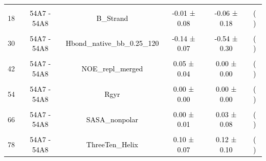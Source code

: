 \documentclass{article}\usepackage[table]{xcolor}
\renewcommand{\$}{$} %
\begin{document}
\begin{center}
\begin{longtable}[t]{lccccc}
\cellcolor{gray!6}{12} & \cellcolor{gray!6}{\textcolor{black}{54A7 - 54A8}} & \cellcolor{gray!6}{\textcolor{black}{B\_Bridge}} & \cellcolor{gray!6}{\textcolor{black}{0.02 ± 0.05}} & \cellcolor{gray!6}{\textcolor{black}{0.02 ± 0.08}} & \cellcolor{gray!6}{\textcolor{black}{( )}}\\
18 & \textcolor{black}{54A7 - 54A8} & \textcolor{black}{B\_Strand} & \textcolor{black}{-0.01 ± 0.08} & \textcolor{black}{-0.06 ± 0.18} & \textcolor{black}{( )}\\
\cellcolor{gray!6}{24} & \cellcolor{gray!6}{\textcolor{black}{54A7 - 54A8}} & \cellcolor{gray!6}{\textcolor{black}{Hbond\_bb\_0.25\_120}} & \cellcolor{gray!6}{\textcolor{black}{-0.07 ± 0.05}} & \cellcolor{gray!6}{\textcolor{black}{-0.29 ± 0.26}} & \cellcolor{gray!6}{\textcolor{black}{( )}}\\
30 & \textcolor{black}{54A7 - 54A8} & \textcolor{black}{Hbond\_native\_bb\_0.25\_120} & \textcolor{black}{-0.14 ± 0.07} & \textcolor{black}{-0.54 ± 0.30} & \textcolor{black}{( )}\\
\cellcolor{gray!6}{36} & \cellcolor{gray!6}{\textcolor{black}{54A7 - 54A8}} & \cellcolor{gray!6}{\textcolor{black}{Jvalue}} & \cellcolor{gray!6}{\textcolor{black}{0.02 ± 0.09}} & \cellcolor{gray!6}{\textcolor{black}{0.03 ± 0.07}} & \cellcolor{gray!6}{\textcolor{black}{( )}}\\
42 & \textcolor{black}{54A7 - 54A8} & \textcolor{black}{NOE\_repl\_merged} & \textcolor{black}{0.05 ± 0.04} & \textcolor{black}{0.00 ± 0.00} & \textcolor{black}{( )}\\
\cellcolor{gray!6}{48} & \cellcolor{gray!6}{\textcolor{black}{54A7 - 54A8}} & \cellcolor{gray!6}{\textcolor{black}{Pi\_Helix}} & \cellcolor{gray!6}{\textcolor{black}{0.04 ± 0.10}} & \cellcolor{gray!6}{\textcolor{black}{0.08 ± 0.11}} & \cellcolor{gray!6}{\textcolor{black}{( )}}\\
54 & \textcolor{black}{54A7 - 54A8} & \textcolor{black}{Rgyr} & \textcolor{black}{0.00 ± 0.00} & \textcolor{black}{0.00 ± 0.00} & \textcolor{black}{( )}\\
\cellcolor{gray!6}{60} & \cellcolor{gray!6}{\textcolor{black}{54A7 - 54A8}} & \cellcolor{gray!6}{\textcolor{black}{RMSD.ADJ}} & \cellcolor{gray!6}{\textcolor{black}{0.13 ± 0.07}} & \cellcolor{gray!6}{\textcolor{black}{0.01 ± 0.01}} & \cellcolor{gray!6}{\textcolor{black}{( )}}\\
66 & \textcolor{black}{54A7 - 54A8} & \textcolor{black}{SASA\_nonpolar} & \textcolor{black}{0.00 ± 0.01} & \textcolor{black}{0.03 ± 0.08} & \textcolor{black}{( )}\\
\cellcolor{gray!6}{72} & \cellcolor{gray!6}{\textcolor{blue}{54A7 - 54A8}} & \cellcolor{gray!6}{\textcolor{blue}{SASA\_polar}} & \cellcolor{gray!6}{\textcolor{blue}{0.07 ± 0.01}} & \cellcolor{gray!6}{\textcolor{blue}{0.56 ± 0.10}} & \cellcolor{gray!6}{\textcolor{black}{(***)}}\\
78 & \textcolor{black}{54A7 - 54A8} & \textcolor{black}{ThreeTen\_Helix} & \textcolor{black}{0.10 ± 0.07} & \textcolor{black}{0.12 ± 0.10} & \textcolor{black}{( )}\\
\bottomrule
\end{longtable}


\end{center}
\end{document}
